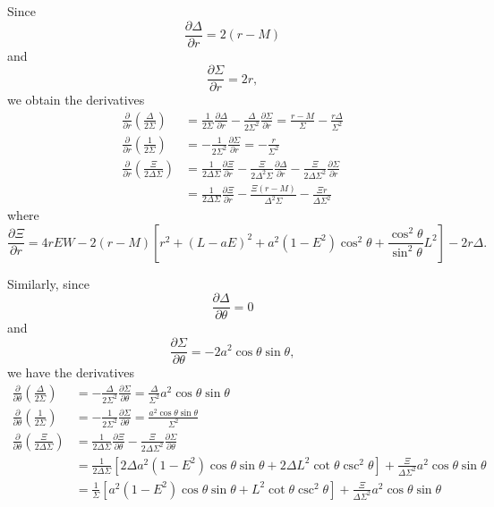 Since 
\begin{equation}
\frac{\partial \Delta}{\partial r} = 2(r-M)
\end{equation}
and 
\begin{equation}
\frac{\partial \Sigma}{\partial r} = 2r,
\end{equation}
we obtain the derivatives
\begin{align}
\frac{\partial}{\partial r}\left( \frac{\Delta}{2\Sigma}\right) &= \frac{1}{2\Sigma} \frac{\partial \Delta}{\partial r} - \frac{\Delta}{2\Sigma^2} \frac{\partial \Sigma}{\partial r} = \frac{r-M}{\Sigma} - \frac{r\Delta}{\Sigma^2} \\
\frac{\partial}{\partial r}\left( \frac{1}{2\Sigma}\right) &= - \frac{1}{2\Sigma^2} \frac{\partial \Sigma}{\partial r} = - \frac{r}{\Sigma^2} \\
\frac{\partial}{\partial r}\left( \frac{\Xi}{2\Delta \Sigma}\right) &= \frac{1}{2\Delta \Sigma} \frac{\partial \Xi}{\partial r} -\frac{\Xi}{2\Delta^2 \Sigma} \frac{\partial \Delta}{\partial r} -\frac{\Xi}{2\Delta \Sigma^2} \frac{\partial \Sigma}{\partial r}  \nonumber \\
&= \frac{1}{2\Delta \Sigma} \frac{\partial \Xi}{\partial r} -\frac{\Xi (r-M)}{\Delta^2 \Sigma} -\frac{\Xi r}{\Delta \Sigma^2} 
\end{align}
where
\begin{equation}
\frac{\partial \Xi}{\partial r}  = 4rEW - 2(r-M) \left[ r^2 + (L-aE)^2  
	+  a^2 (1-E^2)  \cos^2 \theta + \frac{\cos^2 \theta }{\sin^2 \theta} L^2  \right] -2r \Delta.
\end{equation}

Similarly, since
\begin{equation}
\frac{\partial \Delta}{\partial \theta} = 0
\end{equation}
and 
\begin{equation}
\frac{\partial \Sigma}{\partial \theta} = -2a^2 \cos \theta \sin \theta ,
\end{equation}
we have the derivatives
\begin{align}
\frac{\partial}{\partial \theta}\left( \frac{\Delta}{2\Sigma}\right) &= - \frac{\Delta}{2\Sigma^2} \frac{\partial \Sigma}{\partial \theta} =  \frac{\Delta}{\Sigma^2} a^2 \cos \theta \sin \theta \\
\frac{\partial}{\partial \theta}\left( \frac{1}{2\Sigma}\right) &= - \frac{1}{2\Sigma^2} \frac{\partial \Sigma}{\partial \theta} =  \frac{a^2 \cos \theta \sin \theta}{\Sigma^2}  \\
\frac{\partial}{\partial \theta}\left( \frac{\Xi}{2\Delta \Sigma}\right) &= \frac{1}{2\Delta\Sigma} \frac{\partial \Xi}{\partial \theta} - \frac{\Xi}{2\Delta\Sigma^2} \frac{\partial \Sigma}{\partial \theta} \nonumber \\
&= \frac{1}{2\Delta\Sigma} \left[ 2\Delta a^2 (1-E^2) \cos \theta \sin \theta + 2\Delta L^2 \cot \theta \csc ^2 \theta \right] + \frac{\Xi}{\Delta\Sigma^2} a^2 \cos \theta \sin \theta \nonumber \\
&= \frac{1}{\Sigma} \left[  a^2 (1-E^2) \cos \theta \sin \theta + L^2 \cot \theta \csc ^2 \theta \right] + \frac{\Xi}{\Delta\Sigma^2} a^2 \cos \theta \sin \theta 
\end{align}

